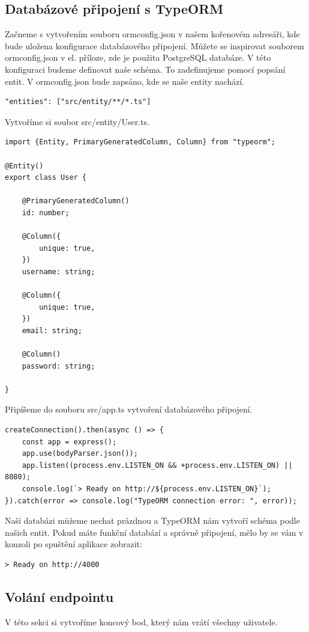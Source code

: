 \documentclass[thesis=B,czech]{FITthesis}[2012/06/26]
\begin{document}
        \subsection{Databázové připojení s TypeORM}
            Začneme s vytvořením souboru ormconfig.json v našem kořenovém adresáři, kde bude uložena konfigurace databázového připojení. Můžete se inspirovat souborem ormconfig.json v el. příloze, zde je použita PostgreSQL databáze. V této konfiguraci budeme definovat naše schéma. To zadefinujeme pomocí popsání entit. V ormconfig.json bude zapsáno, kde se naše entity nachází.
            \begin{verbatim}
"entities": ["src/entity/**/*.ts"]
            \end{verbatim}
            Vytvoříme si soubor src/entity/User.ts.
            \begin{verbatim}
import {Entity, PrimaryGeneratedColumn, Column} from "typeorm";

@Entity()
export class User {

    @PrimaryGeneratedColumn()
    id: number;

    @Column({
        unique: true,
    })
    username: string;

    @Column({
        unique: true,
    })
    email: string;

    @Column()
    password: string;

}
            \end{verbatim}
            Připíšeme do souboru src/app.ts vytvoření databázového připojení.
            \begin{verbatim}
createConnection().then(async () => {
    const app = express();
    app.use(bodyParser.json());
    app.listen((process.env.LISTEN_ON && +process.env.LISTEN_ON) || 8080);
    console.log(`> Ready on http://${process.env.LISTEN_ON}`);
}).catch(error => console.log("TypeORM connection error: ", error));

            \end{verbatim}
            Naší databázi můžeme nechat prázdnou a TypeORM nám vytvoří schéma podle našich entit.
            Pokud máte funkční databází a správně připojení, mělo by se vám v konzoli po spuštění aplikace zobrazit:
            \begin{verbatim}
> Ready on http://4000
            \end{verbatim}
        \subsection{Volání endpointu}
            V této sekci si vytvoříme koncový bod, který nám vrátí všechny uživatele.
            
\end{document}
